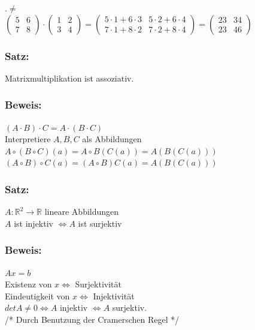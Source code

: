 .\qquad \qquad \qquad \qquad \qquad \qquad \qquad$ \neq $\\
$\begin{pmatrix} 5 & 6 \\ 7 & 8 \end{pmatrix} \cdot \begin{pmatrix} 1 & 2 \\ 3 & 4 \end{pmatrix}= \begin{pmatrix} 5 \cdot 1 + 6 \cdot 3 & 5 \cdot 2 + 6 \cdot 4 \\ 7 \cdot 1 + 8 \cdot 2 & 7 \cdot 2 + 8 \cdot 4 \end{pmatrix} = \begin{pmatrix} 23 & 34 \\ 23 & 46 \end{pmatrix}$\\
%
%
%
\subsubsection{Satz:}
Matrixmultiplikation ist assoziativ.
%
%
%
\subsubsection{Beweis:} 
$(A\cdot B) \cdot C = A \cdot (B \cdot C)$ \\
Interpretiere $A,B,C$ als Abbildungen\\
$A\circ (B \circ C) (a) = A\circ B (C(a)) = A(B(C(a)))$\\
$(A\circ B) \circ C (a)=(A\circ B)C(a)=A(B(C(a)))$
%
%
%
\subsubsection{Satz:}
$A: \mathbb{R}^{2} \rightarrow \mathbb{R}$ lineare Abbildungen\\
$A$ ist injektiv $\Leftrightarrow A$ ist surjektiv
%
%
%
\subsubsection{Beweis:}
$Ax=b$ \\
Existenz von $x \Leftrightarrow$ Surjektivität\\
Eindeutigkeit von $x \Leftrightarrow$ Injektivität\\
$det A \neq 0 \Leftrightarrow A$ injektiv $\Leftrightarrow A$ surjektiv. \\
/* Durch Benutzung der Cramerschen Regel */